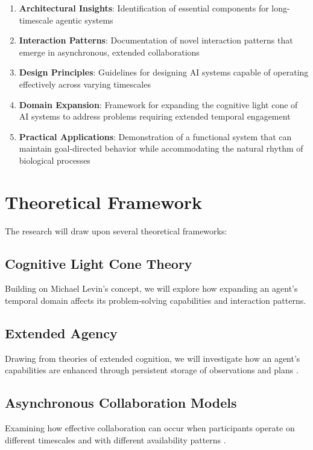 \documentclass[12pt,letterpaper]{article}
\begin{document}
\begin{enumerate}
    \item \textbf{Architectural Insights}: Identification of essential components for long-timescale agentic systems
    \item \textbf{Interaction Patterns}: Documentation of novel interaction patterns that emerge in asynchronous, extended collaborations
    \item \textbf{Design Principles}: Guidelines for designing AI systems capable of operating effectively across varying timescales
    \item \textbf{Domain Expansion}: Framework for expanding the cognitive light cone of AI systems to address problems requiring extended temporal engagement
    \item \textbf{Practical Applications}: Demonstration of a functional system that can maintain goal-directed behavior while accommodating the natural rhythm of biological processes
\end{enumerate}

\section{Theoretical Framework}

The research will draw upon several theoretical frameworks:

\subsection{Cognitive Light Cone Theory}

Building on Michael Levin's concept, we will explore how expanding an agent's temporal domain affects its problem-solving capabilities and interaction patterns.

\subsection{Extended Agency}

Drawing from theories of extended cognition, we will investigate how an agent's capabilities are enhanced through persistent storage of observations and plans \cite{clark1998, jiang2025}.

\subsection{Asynchronous Collaboration Models}

Examining how effective collaboration can occur when participants operate on different timescales and with different availability patterns \cite{krishnan2025}.
\end{document}
